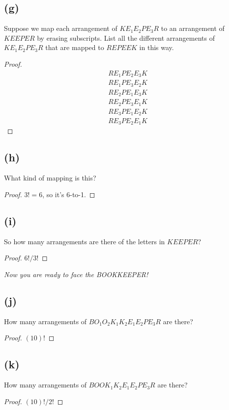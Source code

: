 \documentclass[14pt]{extarticle}
\begin{document}
\subsection{(g)}
Suppose we map each arrangement of $KE_1 E_2 PE_3 R$ to an arrangement of $KEEPER$ by erasing subscripts. List all the different arrangements of $KE_1 E_2 PE_3 R$ that are mapped to $REPEEK$ in this way.
\begin{proof}
$$
\begin{array}{c}
RE_1 P E_2 E_3 K\\ 
RE_1 P E_3 E_2 K\\ 
RE_2 P E_1 E_3 K\\ 
RE_2 P E_3 E_1 K\\ 
RE_3 P E_1 E_2 K\\ 
RE_3 P E_2 E_1 K
\end{array}
$$
\end{proof}

\subsection{(h)}
What kind of mapping is this?
\begin{proof}
$3! = 6$, so it's 6-to-1.
\end{proof}

\subsection{(i)}
So how many arrangements are there of the letters in $KEEPER$?
\begin{proof}
$6!/3!$
\end{proof}

{\it Now you are ready to face the BOOKKEEPER!}

\subsection{(j)}
How many arrangements of $BO_1 O_2 K_1 K_2 E_1 E_2 PE_3 R$ are there?
\begin{proof}
$(10)!$
\end{proof}

\subsection{(k)}
How many arrangements of $BOOK_1 K_2 E_1 E_2 PE_3 R$ are there?
\begin{proof}
$(10)! / 2!$
\end{proof}
\end{document}
